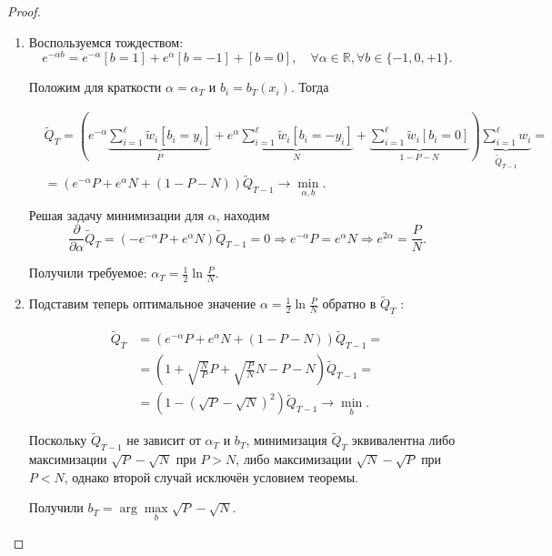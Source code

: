     \begin{proof}
    	\begin{enumerate}[1)]
    		\item Воспользуемся тождеством:
    	\begin{equation*}
    		e^{-\alpha b}=e^{-\alpha}[b=1]+e^\alpha[b=-1]+[b=0],\quad \forall \alpha \in \mathbb{R}, \forall b \in\{-1, 0, +1\}.
    	\end{equation*}

    
    
    
    Положим для краткости $\alpha=\alpha_T$ и $b_i=b_T\left(x_i\right)$. Тогда
    
    \begin{equation*}
    	\begin{aligned}
    		& \widetilde{Q}_T=(e^{-\alpha} \underbrace{\sum_{i=1}^{\ell} \tilde{w}_i\left[b_i=y_i\right]}_P+e^\alpha \underbrace{\sum_{i=1}^{\ell} \tilde{w}_i\left[b_i=-y_i\right]}_N+\underbrace{\sum_{i=1}^{\ell} \tilde{w}_i\left[b_i=0\right]}_{1-P-N}) \underbrace{\sum_{i=1}^{\ell} w_i}_{\tilde{Q}_{T-1}}= \\
    		&=\left(e^{-\alpha} P+e^\alpha N+(1-P-N)\right) \widetilde{Q}_{T-1} \rightarrow \min _{\alpha, b}. \\
    		
    	\end{aligned}
    \end{equation*}
    Решая задачу минимизации для $\alpha$, находим
    \begin{equation*}
    	\frac{\partial}{\partial \alpha} \widetilde{Q}_T=\left(-e^{-\alpha} P+e^\alpha N\right) \widetilde{Q}_{T-1}=0 \Rightarrow e^{-\alpha} P=e^\alpha N \Rightarrow e^{2 \alpha}=\frac{P}{N} .
    \end{equation*}
    
    Получили требуемое: $\alpha_T=\frac{1}{2} \ln \frac{P}{N}$.
    
    \item Подставим теперь оптимальное значение $\alpha=\frac{1}{2} \ln \frac{P}{N}$ обратно в $\widetilde{Q}_T$ :
    
    \begin{equation*}
    	\begin{aligned}
    		\widetilde{Q}_T & =\left(e^{-\alpha} P+e^\alpha N+(1-P-N)\right) \widetilde{Q}_{T-1}= \\
    		& =\left(1+\sqrt{\frac{N}{P}} P+\sqrt{\frac{P}{N}} N-P-N\right) \widetilde{Q}_{T-1}= \\
    		& =\left(1-(\sqrt{P}-\sqrt{N})^2\right) \widetilde{Q}_{T-1} \rightarrow \min _b .
    	\end{aligned}
    \end{equation*}
    
    
    Поскольку $\widetilde{Q}_{T-1}$ не зависит от $\alpha_T$ и $b_T$, минимизация $\widetilde{Q}_T$ эквивалентна либо максимизации $\sqrt{P}-\sqrt{N}$ при $P>N$, либо максимизации $\sqrt{N}-\sqrt{P}$ при $P<N$, однако второй случай исключён условием теоремы.
    
    Получили $b_T=\arg \max\limits_{b} \sqrt{P}-\sqrt{N}$. \qedhere
\end{enumerate}
    \end{proof}
    
